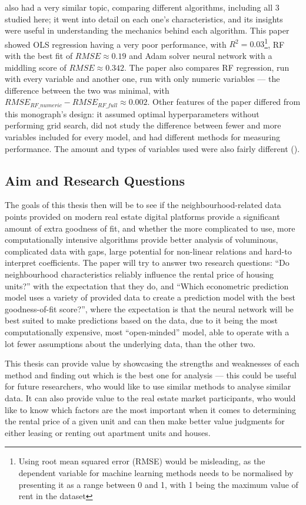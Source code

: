 \documentclass[12pt]{report}
\begin{document}
\textcite{neloy2019} also had a very similar topic, comparing different algorithms, including all 3 studied here; it went into detail on each one's characteristics, and its insights were useful in understanding the mechanics behind each algorithm. This paper showed OLS regression having a very poor performance, with $R^2=0.03$\footnote{Using root mean squared error (RMSE) would be misleading, as the dependent variable for machine learning methods needs to be normalised by presenting it as a range between 0 and 1, with 1 being the maximum value of rent in the dataset}, RF with the best fit of $RMSE\approx 0.19$ and Adam solver neural network with a middling score of $RMSE\approx 0.342$. The paper also compares RF regression, run with every variable and another one, run with only numeric variables --- the difference between the two was minimal, with $RMSE_{RF\_numeric}-RMSE_{RF\_full}\approx 0.002$. Other features of the paper differed from this monograph's design: it assumed optimal hyperparameters without performing grid search, did not study the difference between fewer and more variables included for every model, and had different methods for measuring performance. The amount and types of variables used were also fairly different (\cite[p.352]{neloy2019}).

\subsection{Aim and Research Questions}
The goals of this thesis then will be to see if the neighbourhood-related data points provided on modern real estate digital platforms provide a significant amount of extra goodness of fit, and whether the more complicated to use, more computationally intensive algorithms provide better analysis of voluminous, complicated data with gaps, large potential for non-linear relations and hard-to interpret coefficients. The paper will try to answer two research questions: “Do neighbourhood characteristics reliably influence the rental price of housing units?”  with the expectation that they do, and “Which econometric prediction model uses a variety of provided data to create a prediction model with the best goodness-of-fit score?”, where the expectation is that the neural network will be best suited to make predictions based on the data, due to it being the most computationally expensive, most ``open-minded'' model, able to operate with a lot fewer assumptions about the underlying data, than the other two.

This thesis can provide value by showcasing the strengths and weaknesses of each method and finding out which is the best one for analysis --- this could be useful for future researchers, who would like to use similar methods to analyse similar data. It can also provide value to the real estate market participants, who would like to know which factors are the most important when it comes to determining the rental price of a given unit and can then make better value judgments for either leasing or renting out apartment units and houses.
\end{document}
